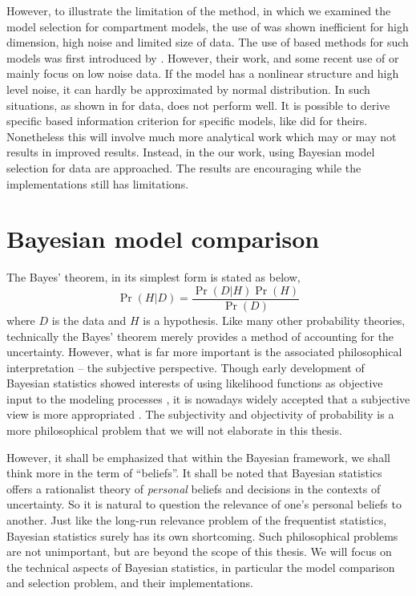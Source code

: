 \documentclass[10pt, hyper, bib, fontset=Lucida,
linespread=1.3, typearearatio=0.75]{marticle}
\begin{document}
However, to illustrate the limitation of the \aicc method, in
\textcite{Zhou:2011uo} which we examined the model selection for compartment
models, the use of \aicc was shown inefficient for high dimension, high noise
and limited size of data. The use of \aic based methods for such models was
first introduced by \textcite{Hawkins:1986ha}. However, their work, and some
recent use of \aic or \aicc mainly focus on low noise data. If the model has a
nonlinear structure and high level noise, it can hardly be approximated by
normal distribution. In such situations, as shown in \textcite{Zhou:2011uo}
for \pet data, \aicc does not perform well. It is possible to derive specific
\aic based information criterion for specific models, like
\textcite{Hurvich:1989ev} did for theirs. Nonetheless this will involve much
more analytical work which may or may not results in improved results.
Instead, in the our work, using Bayesian model selection for \pet data are
approached. The results are encouraging while the implementations still has
limitations.

\section{Bayesian model comparison}
\label{sec:Bayesian model comparison}

The Bayes' theorem, in its simplest form is stated as below,
\begin{equation}
  \Pr(H|D) = \frac{\Pr(D|H)\Pr(H)}{\Pr(D)} \label{eq:bayes}
\end{equation}
where $D$ is the data and $H$ is a hypothesis. Like many other probability
theories, technically the Bayes' theorem merely provides a method of
accounting for the uncertainty. However, what is far more important is the
associated philosophical interpretation -- the subjective perspective. Though
early development of Bayesian statistics showed interests of using likelihood
functions as objective input to the modeling processes
\parencite{Jeffreys:1961ua, Jeffreys:1946jf}, it is nowadays widely accepted
that a subjective view is more appropriated
\parencite[see][chap.~1]{Bernardo:1994vd}.  The subjectivity and objectivity
of probability is a more philosophical problem that we will not elaborate in
this thesis.

However, it shall be emphasized that within the Bayesian framework, we shall
think more in the term of ``beliefs''. It shall be noted that Bayesian
statistics offers a rationalist theory of \emph{personal} beliefs and
decisions in the contexts of uncertainty. So it is natural to question the
relevance of one's personal beliefs to another. Just like the long-run
relevance problem of the frequentist statistics, Bayesian statistics surely
has its own shortcoming. Such philosophical problems are not unimportant, but
are beyond the scope of this thesis. We will focus on the technical aspects of
Bayesian statistics, in particular the model comparison and selection problem,
and their implementations.
\end{document}
